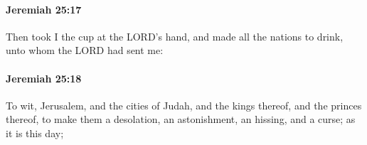 		\paragraph{Jeremiah 25:17} %
			\label{JEREMIAH-25-17}

			Then took I the cup at the LORD’s hand, and made all the nations to drink, unto whom the LORD had sent me:


		\paragraph{Jeremiah 25:18} %
			\label{JEREMIAH-25-18}

			To wit, Jerusalem, and the cities of Judah, and the kings thereof, and the princes thereof, to make them a desolation, an astonishment, an hissing, and a curse; as it is this day;


